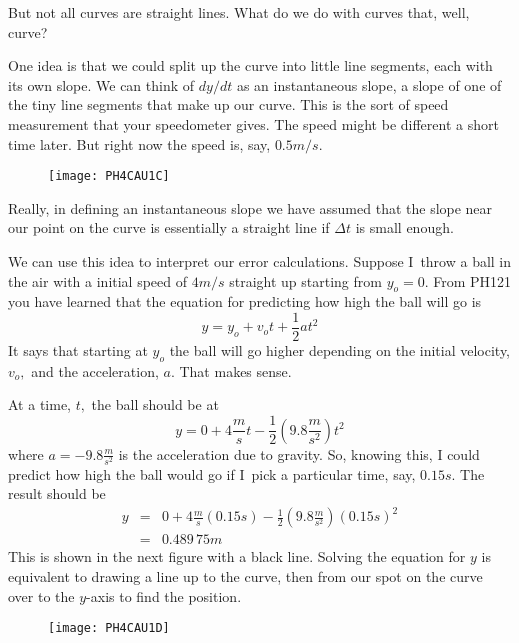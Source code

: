 But not all curves are straight lines. What do we do with curves that, well,
curve?

One idea is that we could split up the curve into little line segments, each
with its own slope. We can think of $dy/dt$ as an instantaneous slope, a
slope of one of the tiny line segments that make up our curve. This is the
sort of speed measurement that your speedometer gives. The speed might be
different a short time later. But right now the speed is, say, $0.5\unit{m}/%
\unit{s}.$

\begin{figure}[h!]
\texttt{[image: PH4CAU1C]}
\end{figure}Really, in defining an
instantaneous slope we have assumed that the slope near our point on the
curve is essentially a straight line if $\Delta t$ is small enough.

We can use this idea to interpret our error calculations. Suppose I\ throw a
ball in the air with a initial speed of $4\unit{m}/\unit{s}$ straight up
starting from $y_{o}=0$. From PH121 you have learned that the equation for
predicting how high the ball will go is 
\begin{equation*}
y=y_{o}+v_{o}t+\frac{1}{2}at^{2}
\end{equation*}%
It says that starting at $y_{o}$ the ball will go higher depending on the
initial velocity, $v_{o},$ and the acceleration, $a.$ That makes sense.

At a time, $t,$ the ball should be at 
\begin{equation*}
y=0+4\frac{\unit{m}}{\unit{s}}t-\frac{1}{2}\left( 9.8\frac{\unit{m}}{\unit{s}%
^{2}}\right) t^{2}
\end{equation*}%
where $a=-9.8\frac{\unit{m}}{\unit{s}^{2}}$ is the acceleration due to
gravity. So, knowing this, I could predict how high the ball would go if I\
pick a particular time, say, $0.15\unit{s}.$ The result should be%
\begin{eqnarray*}
y &=&0+4\frac{\unit{m}}{\unit{s}}\left( 0.15\unit{s}\right) -\frac{1}{2}%
\left( 9.8\frac{\unit{m}}{\unit{s}^{2}}\right) \left( 0.15\unit{s}\right)
^{2} \\
&=&0.489\,75\unit{m}
\end{eqnarray*}%
This is shown in the next figure with a black line. Solving the equation for 
$y$ is equivalent to drawing a line up to the curve, then from our spot on
the curve over to the $y$-axis to find the position.\begin{figure}[h!]
\texttt{[image: PH4CAU1D]}
\end{figure}

